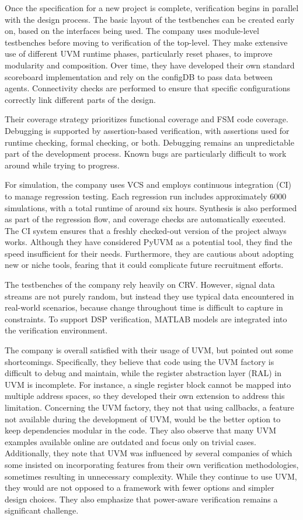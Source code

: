 \documentclass[12pt]{book}
\begin{document}
Once the specification for a new project is complete, verification begins in parallel with the design process. The basic layout of the testbenches can be created early on, based on the interfaces being used. The company uses module-level testbenches before moving to verification of the top-level. They make extensive use of different UVM runtime phases, particularly reset phases, to improve modularity and composition. Over time, they have developed their own standard scoreboard implementation and rely on the configDB to pass data between agents. Connectivity checks are performed to ensure that specific configurations correctly link different parts of the design.

Their coverage strategy prioritizes functional coverage and FSM code coverage. Debugging is supported by assertion-based verification, with assertions used for runtime checking, formal checking, or both. Debugging remains an unpredictable part of the development process. Known bugs are particularly difficult to work around while trying to progress. 

For simulation, the company uses VCS and employs continuous integration (CI) to manage regression testing. Each regression run includes approximately 6000 simulations, with a total runtime of around six hours. Synthesis is also performed as part of the regression flow, and coverage checks are automatically executed. The CI system ensures that a freshly checked-out version of the project always works. Although they have considered PyUVM as a potential tool, they find the speed insufficient for their needs. Furthermore, they are cautious about adopting new or niche tools, fearing that it could complicate future recruitment efforts.

The testbenches of the company rely heavily on CRV. However, signal data streams are not purely random, but instead they use typical data encountered in real-world scenarios, because change throughout time is difficult to capture in constraints. To support DSP verification, MATLAB models are integrated into the verification environment.

The company is overall satisfied with their usage of UVM, but pointed out some shortcomings. Specifically, they believe that code using the UVM factory is difficult to debug and maintain, while the register abstraction layer (RAL) in UVM is incomplete. For instance, a single register block cannot be mapped into multiple address spaces, so they developed their own extension to address this limitation. Concerning the UVM factory, they not that using callbacks, a feature not available during the development of UVM, would be the better option to keep dependencies modular in the code. They also observe that many UVM examples available online are outdated and focus only on trivial cases. Additionally, they note that UVM was influenced by several companies of which some insisted on incorporating features from their own verification methodologies, sometimes resulting in unnecessary complexity. While they continue to use UVM, they would are not opposed to a framework with fewer options and simpler design choices. They also emphasize that power-aware verification remains a significant challenge.
\end{document}
